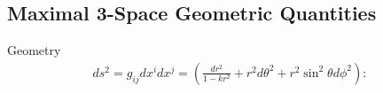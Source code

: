 \documentclass[10pt,letterpaper]{article}
\numberwithin{equation}{section}
\begin{document}
\begin{appendices}

\section{Maximal 3-Space Geometric Quantities}
Geometry
\begin{eqnarray}
ds^2 = g_{ij}dx^idx^j = \left( \frac{dr^2}{1-kr^2} + r^2 d\theta^2 + r^2\sin^2\theta d\phi^2\right):
\end{eqnarray}


\end{appendices}
\end{document}
